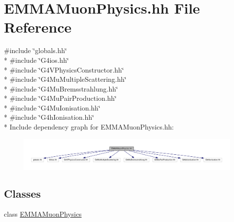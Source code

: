 \hypertarget{EMMAMuonPhysics_8hh}{}\section{E\+M\+M\+A\+Muon\+Physics.\+hh File Reference}
\label{EMMAMuonPhysics_8hh}
{\ttfamily \#include \char`\"{}globals.\+hh\char`\"{}}\\*
{\ttfamily \#include \char`\"{}G4ios.\+hh\char`\"{}}\\*
{\ttfamily \#include \char`\"{}G4\+V\+Physics\+Constructor.\+hh\char`\"{}}\\*
{\ttfamily \#include \char`\"{}G4\+Mu\+Multiple\+Scattering.\+hh\char`\"{}}\\*
{\ttfamily \#include \char`\"{}G4\+Mu\+Bremsstrahlung.\+hh\char`\"{}}\\*
{\ttfamily \#include \char`\"{}G4\+Mu\+Pair\+Production.\+hh\char`\"{}}\\*
{\ttfamily \#include \char`\"{}G4\+Mu\+Ionisation.\+hh\char`\"{}}\\*
{\ttfamily \#include \char`\"{}G4h\+Ionisation.\+hh\char`\"{}}\\*
Include dependency graph for E\+M\+M\+A\+Muon\+Physics.\+hh\+:
\nopagebreak
\begin{figure}[H]
\begin{center}
\leavevmode
\includegraphics[width=350pt]{EMMAMuonPhysics_8hh__incl}
\end{center}
\end{figure}
\subsection*{Classes}
\begin{DoxyCompactItemize}
\item 
class \hyperlink{classEMMAMuonPhysics}{E\+M\+M\+A\+Muon\+Physics}
\end{DoxyCompactItemize}
